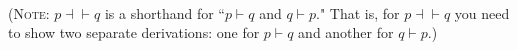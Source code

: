 \documentclass{article}
\begin{document}
\begin{enumerate}[\bf I.]
\begin{enumerate}[1.]
\begin{enumerate}[a.]
\begin{tabular}{l ll lll llll}
   \end{tabular} \\
\end{enumerate}
(\textsc{Note}: $p \dashv\vdash q$ is a shorthand for ``$p \vdash q$
and $q \vdash p$." That is, for $p \dashv \vdash q$ you need to show
two separate derivations: one for $p \vdash q$ and another for $q
\vdash p$.)
\end{enumerate}

\end{enumerate}
\end{document}
